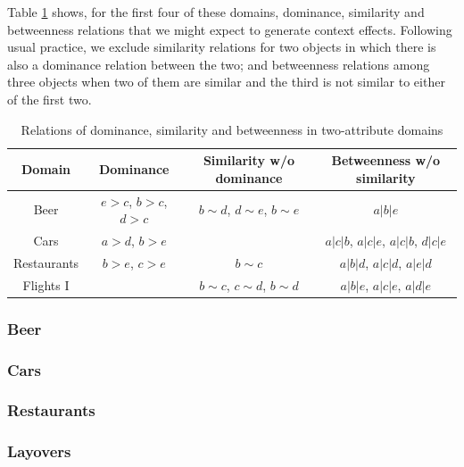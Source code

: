 \documentclass[11pt,letter]{article}
\begin{document}
Table \ref{t:CE} shows, for the first four of these domains, dominance, similarity and betweenness relations that we might expect to generate context effects.
Following usual practice, we exclude similarity relations for two objects in which there is also a dominance relation between the two; and betweenness relations among three objects when two of them are similar and the third is not similar to either of the first two.

\begin{table}
	\centering
	\begin{tabular}{cccc}
		Domain & Dominance & Similarity w/o dominance & Betweenness w/o similarity \\
		\hline
		Beer
		& $e>c$, $b>c$, $d>c$ & $b \sim d$, $d \sim e$, $b \sim e$
		& $a|b|e$ \\
		Cars
		& $a>d$, $b>e$ & & $a|c|b$, $a|c|e$, $a|c|b$, $d|c|e$ \\
		Restaurants
		& $b>e$, $c>e$ & $b \sim c$ & $a|b|d$, $a|c|d$, $a|e|d$ \\
		Flights I
		& & $b \sim c$, $c \sim d$, $b \sim d$ & $a|b|e$, $a|c|e$, $a|d|e$ \\
		\hline
	\end{tabular}\caption{Relations of dominance, similarity and betweenness in two-attribute domains}\label{t:CE}
\end{table}

\subsubsection{Beer}



\subsubsection{Cars}



\subsubsection{Restaurants}



\subsubsection{Layovers}


\end{document}
